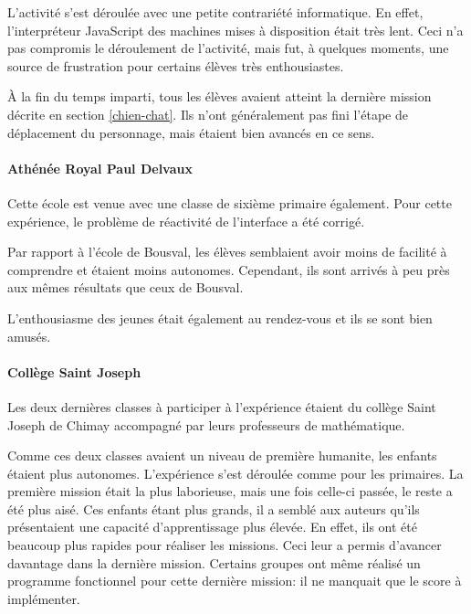 L'activité s'est déroulée avec une petite contrariété informatique. En effet, l'interpréteur JavaScript des machines mises à disposition était très lent. Ceci n'a pas compromis le déroulement de l'activité, mais fut, à quelques moments, une source de frustration pour certains élèves très enthousiastes.

À la fin du temps imparti, tous les élèves avaient atteint la dernière \gls{mission} décrite en section \ref{chien-chat}. Ils n'ont généralement pas fini l'étape de déplacement du personnage, mais étaient bien avancés en ce sens.

\paragraph{Athénée Royal Paul Delvaux}
Cette école est venue avec une classe de sixième \gls{primaire} également. Pour cette expérience, le problème de réactivité de l'interface a été corrigé.

Par rapport à l'école de Bousval, les élèves semblaient avoir moins de facilité à comprendre et étaient moins autonomes.
Cependant, ils sont arrivés à peu près aux mêmes résultats que ceux de Bousval.

L'enthousiasme des jeunes était également au rendez-vous et ils se sont bien amusés.

\paragraph{Collège Saint Joseph}
Les deux dernières classes à participer à l'expérience étaient du collège Saint Joseph de Chimay accompagné par leurs professeurs de mathématique.%

Comme ces deux classes avaient un niveau de première \gls{humanite}, les enfants étaient plus autonomes. L'expérience s'est déroulée comme pour les \glspl{primaire}. La première \gls{mission} était la plus laborieuse, mais une fois celle-ci passée, le reste a été plus aisé. Ces enfants étant plus grands, il a semblé aux auteurs qu'ils présentaient une capacité d'apprentissage plus élevée. En effet, ils ont été beaucoup plus rapides pour réaliser les \glspl{mission}. Ceci leur a permis d'avancer davantage dans la dernière \gls{mission}. Certains groupes ont même réalisé un programme fonctionnel pour cette dernière \gls{mission}: il ne manquait que le score à implémenter.\\

